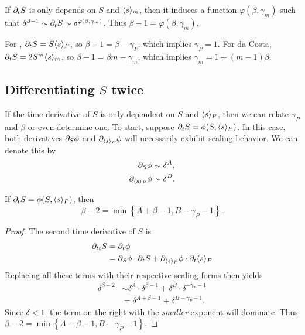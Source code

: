 \documentclass[twoside,10pt]{article}
\begin{document}
If $\partial_{t}{S} $ is only depends on $S$ and $\langle s \rangle_{m}$, then it induces a function $\varphi(\beta, \gamma_{m})$ such that $\delta^{\beta-1} \sim \partial_{t}{S} \sim \delta^{\varphi(\beta, \gamma_{m})}$. Thus $\beta-1 = \varphi(\beta, \gamma_{m})$.

\begin{ex}
For \ER, $\partial_{t}{S} = S \langle s \rangle_{P}$, so $\beta-1 = \beta - \gamma_{P}$, which implies $\gamma_{P}=1$. For da Costa, $\partial_{t}{S} = 2S^{m} \langle s \rangle_{m}$, so $\beta-1 = \beta m - \gamma_{m}$, which implies $\gamma_{m} = 1 + (m-1)\beta$.
\end{ex}



\subsection{Differentiating \texorpdfstring{$S$}{S} twice}

If the time derivative of $S$ is only dependent on $S$ and $\langle s \rangle_{P}$, then we can relate $\gamma_{P}$ and $\beta$ or even determine one. To start, suppose $\partial_{t}{S} = \phi(S, \langle s \rangle_{P})$. In this case, both derivatives $\partial_{S}{\phi} $ and $\partial_{\langle s \rangle_{P}}{\phi} $ will necessarily exhibit scaling behavior. We can denote this by
\begin{align*}
	\partial_{S}{\phi} &\sim \delta^{A}, \\
	\partial_{\langle s \rangle_{P}}{\phi} &\sim \delta^{B}.
\end{align*}

\begin{prop}
	If $\partial_{t}{S} = \phi(S, \langle s \rangle_{P})$, then
	\[
	\beta-2 = \min\left\{ A+\beta-1, B-\gamma_{P}-1 \right\}.
	\]
\end{prop}
\begin{proof}
	The second time derivative of $S$ is
	\begin{align*}
		\partial_{tt}{S} &= \partial_{t}{\phi} \\
			   &= \partial_{S}{\phi} \cdot \partial_{t}{S} + \partial_{\langle s \rangle_{P}}{\phi} \cdot \partial_{t}{\langle s \rangle_{P}} 
	\end{align*}
	Replacing all these terms with their respective scaling forms then yields
	\begin{align*}
		\delta^{\beta-2} &\sim \delta^{A} \cdot \delta^{\beta-1} + \delta^{B} \cdot \delta^{-\gamma_{P}-1} \\
						 &= \delta^{A + \beta - 1} + \delta^{B - \gamma_{P} - 1}.
	\end{align*}
	Since $\delta < 1$, the term on the right with the \textit{smaller} exponent will dominate. Thus $\beta-2 = \min\left\{ A+\beta-1, B-\gamma_{P}-1 \right\}$.
\end{proof}
\end{document}
